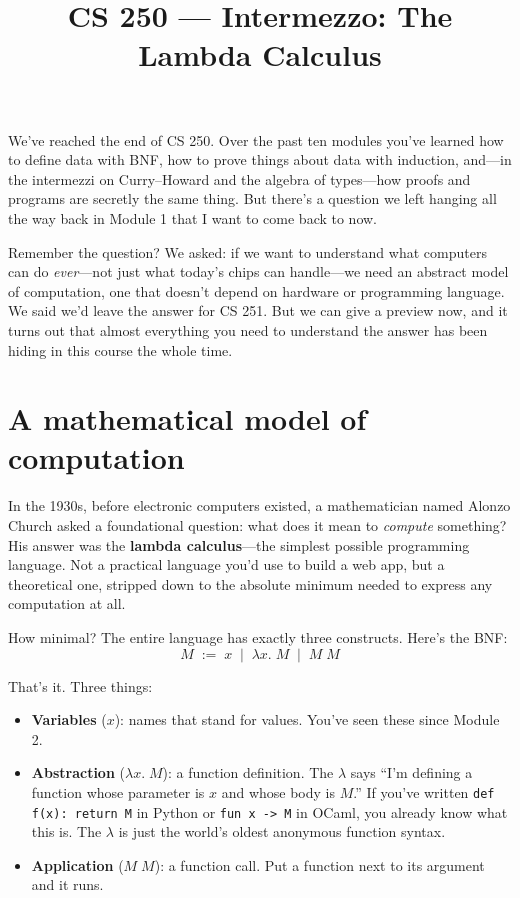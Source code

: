 \documentclass[11pt]{article}
\title{CS 250 --- Intermezzo: The Lambda Calculus}
\author{}
\date{}
\begin{document}
\maketitle

We've reached the end of CS 250. Over the past ten modules you've learned how to define data with BNF, how to prove things about data with induction, and---in the intermezzi on Curry--Howard and the algebra of types---how proofs and programs are secretly the same thing. But there's a question we left hanging all the way back in Module 1 that I want to come back to now.

Remember the question? We asked: if we want to understand what computers can do \emph{ever}---not just what today's chips can handle---we need an abstract model of computation, one that doesn't depend on hardware or programming language. We said we'd leave the answer for CS 251. But we can give a preview now, and it turns out that almost everything you need to understand the answer has been hiding in this course the whole time.

\section{A mathematical model of computation}

In the 1930s, before electronic computers existed, a mathematician named Alonzo Church asked a foundational question: what does it mean to \emph{compute} something? His answer was the \textbf{lambda calculus}---the simplest possible programming language. Not a practical language you'd use to build a web app, but a theoretical one, stripped down to the absolute minimum needed to express any computation at all.

How minimal? The entire language has exactly three constructs. Here's the BNF\@:
\[
M \;:=\; x \;\mid\; \lambda x.\; M \;\mid\; M\; M
\]

That's it. Three things:
\begin{itemize}
  \item \textbf{Variables} ($x$): names that stand for values. You've seen these since Module 2.
  \item \textbf{Abstraction} ($\lambda x.\; M$): a function definition. The $\lambda$ says ``I'm defining a function whose parameter is $x$ and whose body is $M$.'' If you've written \texttt{def f(x): return M} in Python or \texttt{fun x -> M} in OCaml, you already know what this is. The $\lambda$ is just the world's oldest anonymous function syntax.
  \item \textbf{Application} ($M\; M$): a function call. Put a function next to its argument and it runs.
\end{itemize}
\end{document}
